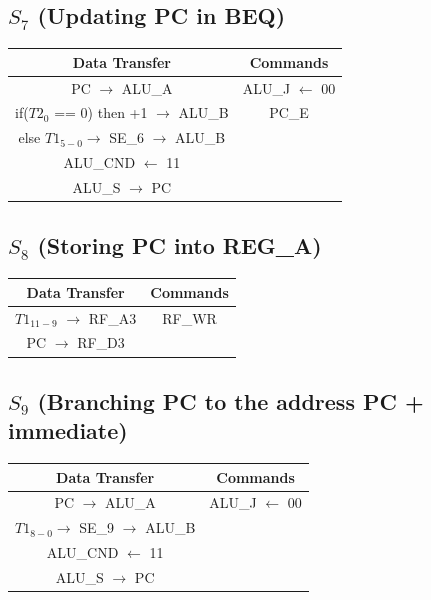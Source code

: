 \documentclass[]{report}
\begin{document}
        \subsection*{$S_7$ (Updating PC in BEQ)} %
        \begin{center}
            \begin{tabular}{|c|c|}
                \hline
                Data Transfer & Commands \\
                \hline
                PC $\to$ ALU\_A & ALU\_J $\leftarrow$ 00\\
                if($T2_0$ == 0) then +1 $\to$ ALU\_B & PC\_E\\
                else $T1_{5-0} \to$ SE\_6 $\to$ ALU\_B & \\
                ALU\_CND $\leftarrow$ 11 & \\
                ALU\_S $\to$ PC & \\
                \hline
            \end{tabular}
        \end{center}
        \subsection*{$S_8$ (Storing PC into REG\_A)} %
        \begin{center}
            \begin{tabular}{|c|c|}
                \hline
                Data Transfer & Commands \\
                \hline
                $T1_{11-9}$ $\to$ RF\_A3 & RF\_WR\\
                PC $\to$ RF\_D3 & \\
                \hline
            \end{tabular}
        \end{center}
        \subsection*{$S_9$ (Branching PC to the address PC + immediate)} %
        \begin{center}
            \begin{tabular}{|c|c|}
                \hline
                Data Transfer & Commands \\
                \hline
                PC $\to$ ALU\_A & ALU\_J $\leftarrow$ 00\\
                $T1_{8-0} \to$ SE\_9 $\to$ ALU\_B & \\
                ALU\_CND $\leftarrow$ 11 & \\
                ALU\_S $\to$ PC & \\
                \hline
            \end{tabular}
        \end{center}
\end{document}
